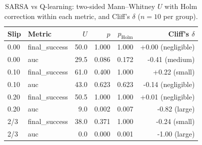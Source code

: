 \begin{table}[t]
\centering
\small
\caption{SARSA vs Q-learning: two-sided Mann--Whitney $U$ with Holm correction within each metric, and Cliff's $\delta$ ($n=10$ per group).}
\label{tab:stats}
\begin{tabular}{llrrrr}
\toprule
Slip & Metric & $U$ & $p$ & $p_{\text{Holm}}$ & Cliff's $\delta$ \\
\midrule
0.00 & final_success & 50.0 & 1.000 & 1.000 & +0.00 (negligible) \\
0.00 & auc & 29.5 & 0.086 & 0.172 & -0.41 (medium) \\
0.10 & final_success & 61.0 & 0.400 & 1.000 & +0.22 (small) \\
0.10 & auc & 43.0 & 0.623 & 0.623 & -0.14 (negligible) \\
0.20 & final_success & 50.5 & 1.000 & 1.000 & +0.01 (negligible) \\
0.20 & auc & 9.0 & 0.002 & 0.007 & -0.82 (large) \\
2/3 & final_success & 38.0 & 0.371 & 1.000 & -0.24 (small) \\
2/3 & auc & 0.0 & 0.000 & 0.001 & -1.00 (large) \\
\bottomrule
\end{tabular}
\end{table}